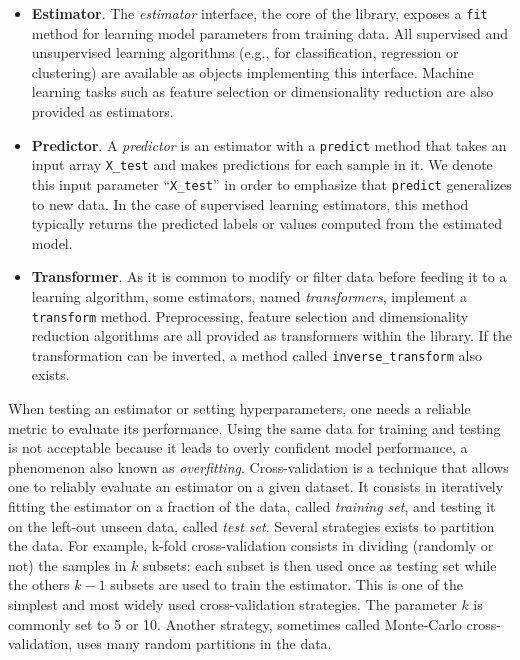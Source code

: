 \documentclass{frontiersSCNS} %
\begin{document}
\begin{itemize}
\item {\bf Estimator}. The \textit{estimator} interface, the core of the
    library, exposes a \texttt{fit} method for learning model parameters from training data.
    All supervised
    and unsupervised learning algorithms (e.g., for classification, regression or
    clustering) are available as objects implementing this interface. Machine
    learning tasks such as feature selection or dimensionality
    reduction are also provided as estimators.

\item {\bf Predictor}. A \textit{predictor} is an estimator with
    a \texttt{predict}
    method that takes an input array \texttt{X\_test} and makes
    predictions for each sample in it.
    We denote this input parameter ``\texttt{X\_test}'' in order
    to emphasize that \texttt{predict} generalizes to new data. In the case of
    supervised learning estimators, this method typically returns the predicted
    labels or values computed from the estimated model.

\item {\bf Transformer}. As it is common to modify or filter data before feeding it to a learning
    algorithm, some estimators, named \textit{transformers}, implement a
    \texttt{transform} method. Preprocessing, feature selection and
    dimensionality reduction
    algorithms are all provided as transformers within the library. If the transformation
    can be inverted, a method called \texttt{inverse\_transform} also exists.

\end{itemize}

\smallskip

When testing an estimator or setting hyperparameters, one needs a reliable
metric to evaluate its performance. Using the same
data for training and testing is not acceptable because it leads to
overly confident model performance, a phenomenon also known as \emph{overfitting}.
Cross-validation is a technique that allows one to reliably evaluate an
estimator on a given dataset. It consists in iteratively fitting the
estimator on a fraction of the data, called \emph{training set}, and testing it
on the left-out unseen data, called \emph{test set}.
Several strategies exists to partition the data.
For example, k-fold cross-validation consists in dividing (randomly or not) the samples in $k$
subsets: each subset is then used once as testing set while the others $k - 1$
subsets are used to train the estimator. This is one of the simplest and most
widely used cross-validation strategies. The parameter $k$ is commonly set
to 5 or 10. Another strategy, sometimes called Monte-Carlo cross-validation,
uses many random partitions in the data.
\end{document}
